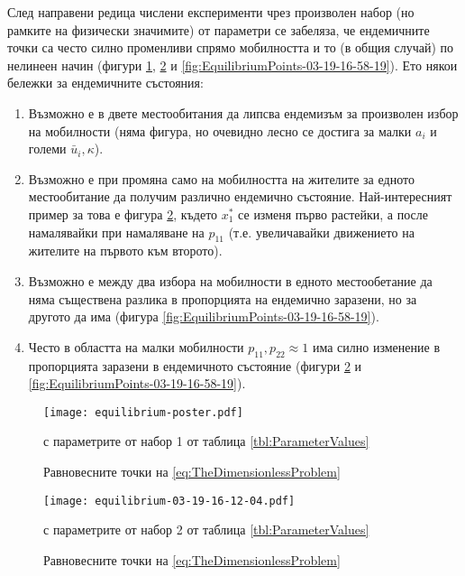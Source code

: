 След направени редица числени експерименти чрез произволен набор (но рамките на физически значимите) от параметри се забеляза, че ендемичните точки са често силно променливи спрямо мобилността и то (в общия случай) по нелинеен начин (фигури \ref{fig:EquilibriumPoints-poster}, \ref{fig:EquilibriumPoints-03-19-16-12-04} и \ref{fig:EquilibriumPoints-03-19-16-58-19}). Ето някои бележки за ендемичните състояния:
\begin{enumerate}
  \item Възможно е в двете местообитания да липсва ендемизъм за произволен избор на мобилности (няма фигура, но очевидно лесно се достига за малки $a_i$ и големи $\bar{u}_i, \kappa$).
  \item Възможно е при промяна само на мобилността на жителите за едното местообитание да получим различно ендемично състояние. Най-интересният пример за това е фигура \ref{fig:EquilibriumPoints-03-19-16-12-04}, където $x_1^*$ се изменя първо растейки, а после намалявайки при намаляване на $p_{11}$ (т.е. увеличавайки движението на жителите на първото към второто).
  \item Възможно е между два избора на мобилности в едното местообетание да няма съществена разлика в пропорцията на ендемично заразени, но за другото да има (фигура \ref{fig:EquilibriumPoints-03-19-16-58-19}).
  \item Често в областта на малки мобилности $p_{11}, p_{22} \approx 1$ има силно изменение в пропорцията заразени в ендемичното състояние (фигури \ref{fig:EquilibriumPoints-03-19-16-12-04} и \ref{fig:EquilibriumPoints-03-19-16-58-19}).
\end{enumerate}

\begin{figure}[H]
  \centering
  \texttt{[image: equilibrium-poster.pdf]}
  \caption{Равновесните точки на \eqref{eq:TheDimensionlessProblem}} с параметрите от набор 1 от таблица \ref{tbl:ParameterValues}
  \label{fig:EquilibriumPoints-poster}
\end{figure}
% 

\begin{figure}[H]
  \centering
  \texttt{[image: equilibrium-03-19-16-12-04.pdf]}
  \caption{Равновесните точки на \eqref{eq:TheDimensionlessProblem}} с параметрите от набор 2 от таблица \ref{tbl:ParameterValues}
  \label{fig:EquilibriumPoints-03-19-16-12-04}
\end{figure}
% 

